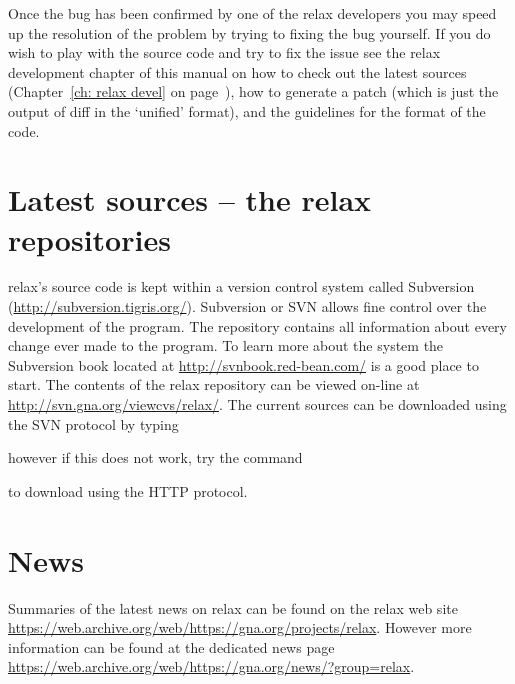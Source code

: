 Once the bug has been confirmed by one of the relax developers you may speed up the resolution of the problem by trying to fixing the bug yourself.
If you do wish to play with the source code and try to fix the issue see the relax development chapter of this manual on how to check out the latest sources (Chapter~\ref{ch: relax devel} on page~\pageref{ch: relax devel}), how to generate a patch (which is just the output of diff in the `unified' format), and the guidelines for the format of the code.




\section{Latest sources -- the relax repositories}

relax's source code is kept within a version control system called Subversion (\href{http://subversion.tigris.org/}{http://subversion.tigris.org/}).
Subversion or SVN allows fine control over the development of the program.
The repository contains all information about every change ever made to the program.
To learn more about the system the Subversion book located at \href{http://svnbook.red-bean.com/}{http://svnbook.red-bean.com/} is a good place to start.
The contents of the relax repository can be viewed on-line at \href{http://svn.gna.org/viewcvs/relax/}{http://svn.gna.org/viewcvs/relax/}.
The current sources can be downloaded using the SVN protocol by typing


however if this does not work, try the command


to download using the HTTP protocol.




\section{News}

Summaries of the latest news on relax can be found on the relax web site \href{https://web.archive.org/web/https://gna.org/projects/relax}{https://web.archive.org/web/https://gna.org/projects/relax}.
However more information can be found at the dedicated news page \href{https://web.archive.org/web/https://gna.org/news/?group=relax}{https://web.archive.org/web/https://gna.org/news/?group=relax}.



